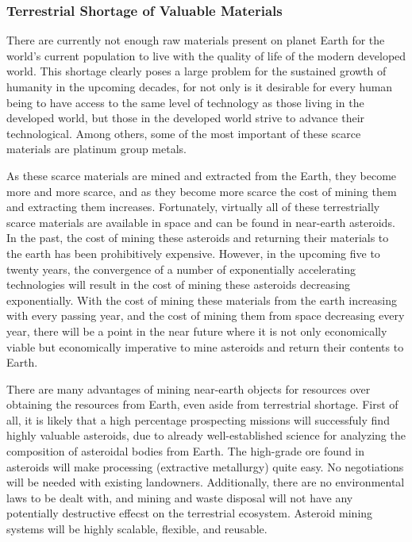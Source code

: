 \documentclass[letter,11pt]{article}
\begin{document}
\subsubsection*{Terrestrial Shortage of Valuable Materials}

There are currently not enough raw materials present on planet Earth
for the world's current population to live with the quality of life
of the modern developed world\cite{gordon}. This shortage clearly
poses a large problem for the sustained growth of humanity in the
upcoming decades, for not only is it desirable for every human being
to have access to the same level of technology as those living in
the developed world, but those in the developed world strive to advance
their technological. Among others, some of the most important of these
scarce materials are platinum group metals\cite{gerlach}.

As these scarce materials are mined and extracted from the Earth,
they become more and more scarce, and as they become more scarce the
cost of mining them and extracting them increases. Fortunately, virtually
all of these terrestrially scarce materials are available in space
and can be found in near-earth asteroids. In the past, the cost of
mining these asteroids and returning their materials to the earth
has been prohibitively expensive. However, in the upcoming five to
twenty years, the convergence of a number of exponentially accelerating
technologies will result in the cost of mining these asteroids decreasing
exponentially. With the cost of mining these materials from the earth
increasing with every passing year, and the cost of mining them from
space decreasing every year, there will be a point in the near future
where it is not only economically viable but economically imperative
to mine asteroids and return their contents to Earth\cite{gerlach}.

There are many advantages of mining near-earth objects for resources
over obtaining the resources from Earth, even aside from terrestrial
shortage. First of all, it is likely that a high percentage prospecting
missions will successfuly find highly valuable asteroids, due to already
well-established science for analyzing the composition of asteroidal
bodies from Earth. The high-grade ore found in asteroids will make
processing (extractive metallurgy) quite easy. No negotiations will
be needed with existing landowners. Additionally, there are no environmental
laws to be dealt with, and mining and waste disposal will not have
any potentially destructive effecst on the terrestrial ecosystem.
Asteroid mining systems will be highly scalable, flexible, and reusable\cite{sonter}.
\end{document}
